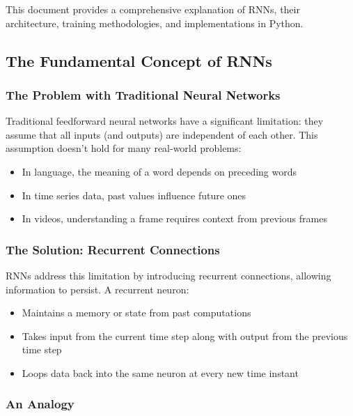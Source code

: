 \documentclass[
  letterpaper,
  DIV=11,
  numbers=noendperiod]{scrreprt}
\providecommand{\tightlist}{%
  \setlength{\itemsep}{0pt}\setlength{\parskip}{0pt}}\usepackage{longtable,booktabs,array}
\begin{document}
This document provides a comprehensive explanation of RNNs, their
architecture, training methodologies, and implementations in Python.

\subsection{The Fundamental Concept of
RNNs}\label{the-fundamental-concept-of-rnns}

\subsubsection{The Problem with Traditional Neural
Networks}\label{the-problem-with-traditional-neural-networks}

Traditional feedforward neural networks have a significant limitation:
they assume that all inputs (and outputs) are independent of each other.
This assumption doesn't hold for many real-world problems:

\begin{itemize}
\tightlist
\item
  In language, the meaning of a word depends on preceding words
\item
  In time series data, past values influence future ones
\item
  In videos, understanding a frame requires context from previous frames
\end{itemize}

\subsubsection{The Solution: Recurrent
Connections}\label{the-solution-recurrent-connections}

RNNs address this limitation by introducing recurrent connections,
allowing information to persist. A recurrent neuron:

\begin{itemize}
\tightlist
\item
  Maintains a memory or state from past computations
\item
  Takes input from the current time step along with output from the
  previous time step
\item
  Loops data back into the same neuron at every new time instant
\end{itemize}

\subsubsection{An Analogy}\label{an-analogy-1}
\end{document}

